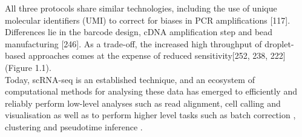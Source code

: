 All three protocols share similar technologies, including the use of unique molecular identifiers (UMI) to correct for biases in PCR amplifications [117]. 
Differences lie in the barcode design, cDNA amplification step and bead manufacturing [246]. 
As a trade-off, the increased high throughput of droplet-based approaches comes at the expense of reduced sensitivity[252, 238, 222] (Figure 1.1).
\\

Today, scRNA-seq is an established technique, and 
an ecosystem of computational methods for analysing these data has emerged 
to efficiently and reliably perform low-level analyses such as read alignment, cell calling and visualisation \cite{maaten2008visualizing, mcinnes2018umap} as well as to perform higher level tasks such as batch correction \cite{haghverdi2018batch, butler2018integrating, nowotschin2019emergent, stuart2019comprehensive, welch2019single, polanski2020bbknn}, clustering \cite{kiselev2017sc3, traag2019louvain} and pseudotime inference \cite{haghverdi2016diffusion}.\\

